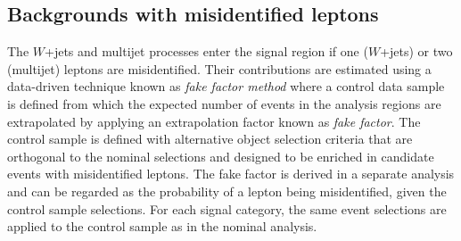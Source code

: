 \subsection{Backgrounds with misidentified leptons}
\label{subsec:misid-bkg}
The $W$+jets and multijet processes enter the signal region if one ($W$+jets) or two (multijet) leptons are misidentified.
Their contributions are estimated using a data-driven technique known as \emph{fake factor method} where a control data sample is defined from which the expected number of events in the analysis regions are extrapolated by applying an extrapolation factor known as \emph{fake factor}.
The control sample is defined with alternative object selection criteria that are orthogonal to the nominal selections and designed to be enriched in candidate events with misidentified leptons.
The fake factor is derived in a separate analysis and can be regarded as the probability of a lepton being misidentified, given the control sample selections.
For each signal category, the same event selections are applied to the control sample as in the nominal analysis.

